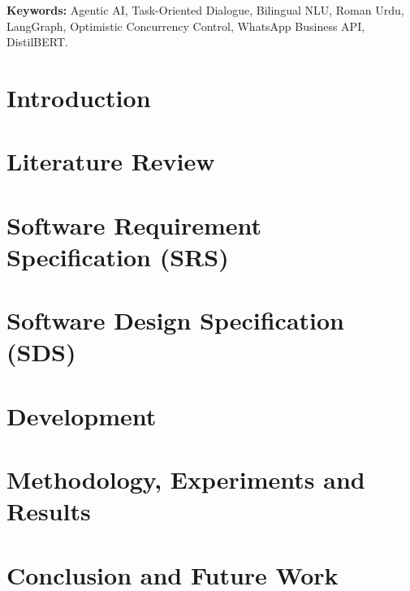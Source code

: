 \documentclass[12pt,a4paper,oneside]{report}
\begin{document}
\vspace{4pt}
\noindent\textbf{Keywords:} Agentic AI, Task-Oriented Dialogue, Bilingual NLU,
Roman Urdu, LangGraph, Optimistic Concurrency Control, WhatsApp Business API,
DistilBERT.

\setcounter{tocdepth}{2}

\tableofcontents
\listoffigures
\listoftables

\chapter{Introduction}
\label{chap:intro}


\chapter{Literature Review}
\label{chap:lit}


\chapter[Software Requirement Specification (SRS)]{Software Requirement\\Specification (SRS)}
\label{chap:srs}


\chapter[Software Design Specification (SDS)]{Software Design Specification\\(SDS)}
\label{chap:sds}


\chapter{Development}
\label{chap:dev}


\chapter{Methodology, Experiments and Results}
\label{chap:results}


\chapter{Conclusion and Future Work}
\label{chap:outro}

\end{document}
